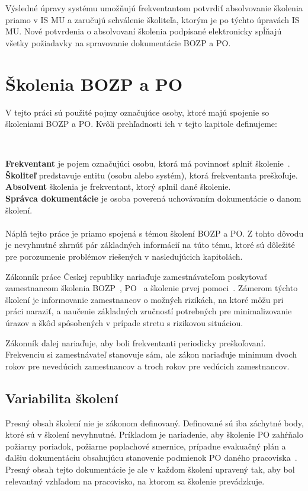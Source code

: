 \documentclass[
  digital,     %
  oneside,     %
  nosansbold,  %
  nocolorbold, %
  lof,         %
  nolot,         %
]{fithesis4}
\begin{document}
Výsledné úpravy systému umožňujú frekventantom potvrdiť absolvovanie školenia priamo v IS MU a zaručujú schválenie školiteľa, ktorým je po týchto úpravách IS MU. Nové potvrdenia o absolvovaní školenia podpísané elektronicky spĺňajú všetky požiadavky na spravovanie dokumentácie BOZP a PO.


\chapter{Školenia BOZP a PO}
\label{kap-1}
V tejto práci sú použité pojmy označujúce osoby, ktoré majú spojenie so školeniami BOZP a PO. Kvôli prehľadnosti ich v tejto kapitole definujeme:

~

    \textbf{Frekventant} je pojem označujúci osobu, ktorá má povinnosť splniť školenie~\cite[9]{kandova2019}.\\
    
    \textbf{Školiteľ} predstavuje entitu (osobu alebo systém), ktorá frekventanta preškoľuje.\\
    
    \textbf{Absolvent} školenia je frekventant, ktorý splnil dané školenie.\\

    \textbf{Správca dokumentácie} je osoba poverená uchovávaním dokumentácie o danom školení.
~
\\\\
Náplň tejto práce je priamo spojená s témou školení BOZP a PO. Z tohto dôvodu je nevyhnutné zhrnúť pár základných informácií na túto tému, ktoré sú dôležité pre porozumenie problémov riešených v nasledujúcich kapitolách.

Zákonník práce Českej republiky nariaďuje zamestnávateľom poskytovať zamestnancom školenia BOZP~\cite[§~103~odst.~3]{cesko_zakonik_prace}, PO~\cite[§~349~odst.~1]{cesko_zakonik_prace} a školenie prvej pomoci~\cite[§~102~odst.~6]{cesko_zakonik_prace}. Zámerom týchto školení je informovanie zamestnancov o možných rizikách, na ktoré môžu pri práci naraziť, a naučenie základných zručností potrebných pre minimalizovanie úrazov a škôd spôsobených v prípade stretu s rizikovou situáciou.

Zákonník ďalej nariaďuje, aby boli frekventanti periodicky preškoľovaní. Frekvenciu si zamestnávateľ stanovuje sám, ale zákon nariaďuje minimum dvoch rokov pre nevedúcich zamestnancov a troch rokov pre vedúcich zamestnancov.~\cite[~§103~odst.~3]{cesko_zakonik_prace}

\section{Variabilita školení}
Presný obsah školení nie je zákonom definovaný. Definované sú iba záchytné body, ktoré sú v školení nevyhnutné. Príkladom je nariadenie, aby školenie PO zahŕňalo požiarny poriadok, požiarne poplachové smernice, prípadne evakuačný plán a ďalšiu dokumentáciu obsahujúcu stanovenie podmienok PO daného pracoviska~\cite[~§23~odst.~1~c)]{cesko_vyhlaska_poziarna_prevence}. Presný obsah tejto dokumentácie je ale v každom školení upravený tak, aby bol relevantný vzhľadom na pracovisko, na ktorom sa školenie prevádzkuje.
\end{document}
